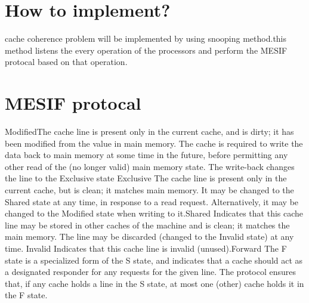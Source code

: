 \documentclass[12pt]{article}
\begin{document}
\section{How to implement?}

cache coherence problem will be implemented by using snooping method.this method listens the every operation of the processors and perform the MESIF protocal based on that operation.

\section{MESIF protocal}
Modified\newline The cache line is present only in the current cache, and is dirty; it has been modified from the value in main memory. The cache is required to write the data back to main memory at some time in the future, before permitting any other read of the (no longer valid) main memory state. The write-back changes the line to the Exclusive state \newline \newline Exclusive \newline The cache line is present only in the current cache, but is clean; it matches main memory. It may be changed to the Shared state at any time, in response to a read request. Alternatively, it may be changed to the Modified state when writing to it.\newline \newline Shared \newline Indicates that this cache line may be stored in other caches of the machine and is clean; it matches the main memory. The line may be discarded (changed to the Invalid state) at any time.\newline \newline \newline
Invalid \newline Indicates that this cache line is invalid (unused).\newline \newline Forward \newline The F state is a specialized form of the S state, and indicates that a cache should act as a designated responder for any requests for the given line. The protocol ensures that, if any cache holds a line in the S state, at most one (other) cache holds it in the F state.
\end{document}
